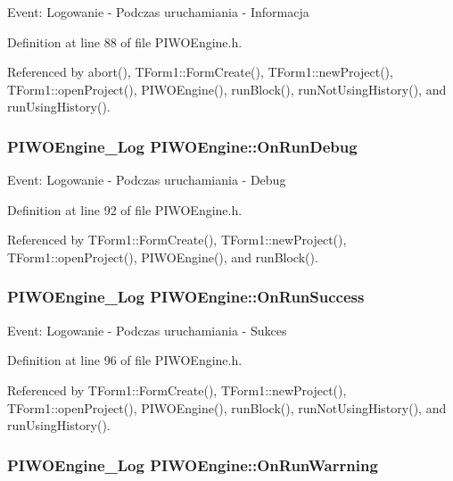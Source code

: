 Event: Logowanie - Podczas uruchamiania - Informacja 

Definition at line 88 of file PIWOEngine.h.

Referenced by abort(), TForm1::FormCreate(), TForm1::newProject(), TForm1::openProject(), PIWOEngine(), runBlock(), runNotUsingHistory(), and runUsingHistory().\hypertarget{classPIWOEngine_cc1ea09371765860dfc2912dc605f9be}{
\subsubsection[OnRunDebug]{\setlength{\rightskip}{0pt plus 5cm}PIWOEngine\_\-Log {\bf PIWOEngine::OnRunDebug}}}
\label{classPIWOEngine_cc1ea09371765860dfc2912dc605f9be}


Event: Logowanie - Podczas uruchamiania - Debug 

Definition at line 92 of file PIWOEngine.h.

Referenced by TForm1::FormCreate(), TForm1::newProject(), TForm1::openProject(), PIWOEngine(), and runBlock().\hypertarget{classPIWOEngine_faa892e8c9a1a5973a300d2f02143897}{
\subsubsection[OnRunSuccess]{\setlength{\rightskip}{0pt plus 5cm}PIWOEngine\_\-Log {\bf PIWOEngine::OnRunSuccess}}}
\label{classPIWOEngine_faa892e8c9a1a5973a300d2f02143897}


Event: Logowanie - Podczas uruchamiania - Sukces 

Definition at line 96 of file PIWOEngine.h.

Referenced by TForm1::FormCreate(), TForm1::newProject(), TForm1::openProject(), PIWOEngine(), runBlock(), runNotUsingHistory(), and runUsingHistory().\hypertarget{classPIWOEngine_ede20b6476b9e1d0db96878e2eee4481}{
\subsubsection[OnRunWarrning]{\setlength{\rightskip}{0pt plus 5cm}PIWOEngine\_\-Log {\bf PIWOEngine::OnRunWarrning}}}
\label{classPIWOEngine_ede20b6476b9e1d0db96878e2eee4481}



